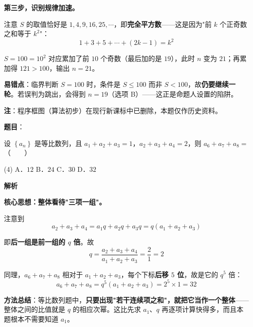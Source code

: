\begin{answer}
\textbf{第三步，识别规律加速。}

注意 $S$ 的取值恰好是 $1,4,9,16,25,\cdots$，即\textbf{完全平方数}——这是因为"前 $k$ 个正奇数之和等于 $k^{2}$"：
\nopagebreak[4]
\[1+3+5+\cdots+(2k-1)=k^{2}\]

$S=100=10^{2}$ 对应累加了前 $10$ 个奇数（最后加的是 $19$），此时 $n$ 变为 $21$；再累加得 $121>100$，输出 $n=21$。

\begin{gktip}
\textbf{易错点}：临界判断 $S=100$ 时，条件是 $S\le100$ 而非 $S<100$，故\textbf{仍要继续一轮}。若误判为跳出，会得到 $n=19$（选项 B）——这正是命题人设置的陷阱。

\textbf{注}：程序框图（算法初步）在现行新课标中已删除，本题仅作历史资料。
\end{gktip}


\par\medskip

\end{answer}
\begin{answer}

\textbf{题目}：

设 $\left\{a_n\right\}$ 是等比数列，且 $a_1+a_2+a_3=1$，$a_2+a_3+a_4=2$，则 $a_6+a_7+a_8=$\mbox{（　　）}

\begin{gkopts}(4)
\task A．$12$
\task B．$24$
\task C．$30$
\task D．$32$
\end{gkopts}

\textbf{解析}

\textbf{核心思想：整体看待"三项一组"。}

注意到
\nopagebreak[4]
\[a_2+a_3+a_4=a_1q+a_2q+a_3q=q\left(a_1+a_2+a_3\right)\]

即\textbf{后一组是前一组的 $q$ 倍}。故
\nopagebreak[4]
\[q=\frac{a_2+a_3+a_4}{a_1+a_2+a_3}=\frac21=2\]

同理，$a_6+a_7+a_8$ 相对于 $a_1+a_2+a_3$，每个下标\textbf{后移 $5$ 位}，故是它的 $q^{5}$ 倍：
\nopagebreak[4]
\[a_6+a_7+a_8=q^{5}\left(a_1+a_2+a_3\right)=2^{5}\times1=32\]

\begin{gktip}
\textbf{方法总结}：等比数列题中，\textbf{只要出现"若干连续项之和"，就把它当作一个整体}——整体之间的比值就是 $q$ 的相应次幂。这比先求 $a_1$、$q$ 再逐项计算快得多，而且本题根本不需要知道 $a_1$。
\end{gktip}


\par\medskip

\end{answer}
